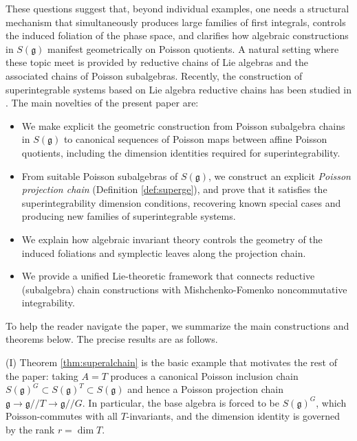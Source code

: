 \documentclass[11pt,reqno]{amsart}
\newtheorem*{theorem A}{Main Theorem A}
\newtheorem*{theorem B}{Main Theorem B}
\newtheorem*{theorem C}{Main Theorem C}
\newtheorem*{theorem D}{Main Theorem D}
\theoremstyle{definition}
\theoremstyle{plain}
\theoremstyle{conclusion}
\begin{document}
These questions suggest that, beyond individual examples, one needs a structural mechanism that simultaneously produces large families of first integrals, controls the induced foliation of the phase space, and clarifies how algebraic constructions in $S(\mathfrak{g})$ manifest geometrically on Poisson quotients. A natural setting where these topic meet is provided by 
reductive chains of Lie algebras and the associated chains of Poisson subalgebras. %
 Recently, the construction of superintegrable systems based on Lie algebra reductive chains has been studied in \cite{campoamor2026construction,marquette2023algebraic,campoamor2023algebraic}. The main novelties of the present paper are:
\begin{itemize}
\item We make explicit the geometric construction from Poisson subalgebra chains in $S(\mathfrak{g})$ to canonical sequences of Poisson maps between affine Poisson quotients, including the dimension identities required for superintegrability.
\item From suitable Poisson subalgebras of $S(\mathfrak{g})$, we construct an explicit \emph{Poisson projection chain} (Definition \ref{def:superge}), and prove that it satisfies the superintegrability dimension conditions, recovering known special cases and producing new families of superintegrable systems.
\item We explain how algebraic invariant theory controls the geometry of the induced foliations and symplectic leaves along the projection chain.
\item We provide a unified Lie-theoretic framework that connects reductive (subalgebra) chain constructions with Mishchenko-Fomenko noncommutative integrability.
\end{itemize}

To help the reader navigate the paper, we summarize the main constructions and theorems below.  The precise results are as follows.

(I) Theorem \ref{thm:superalchain} is the basic example that motivates the rest of the paper: taking $A=T$ produces a canonical Poisson inclusion chain $S(\mathfrak{g})^G\subset S(\mathfrak{g})^T\subset S(\mathfrak{g})$ and hence a Poisson projection chain $\mathfrak{g}\to\mathfrak{g}//T\to\mathfrak{g}//G$. In particular, the base algebra is forced to be $S(\mathfrak{g})^G$, which Poisson-commutes with all $T$-invariants, and the dimension identity is governed by the rank $r=\dim T$.
\end{document}
